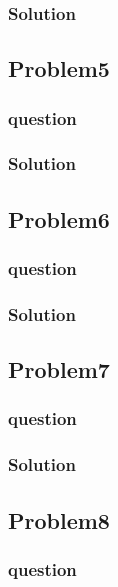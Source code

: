 \documentclass[journal,12pt,twocolumn]{IEEEtran}
\begin{document}
\subsubsection{Solution}


\subsection{Problem5}
\subsubsection{question}

\subsubsection{Solution}


\subsection{Problem6}
\subsubsection{question}

\subsubsection{Solution}


\subsection{Problem7}
\subsubsection{question}

\subsubsection{Solution}


\subsection{Problem8}
\subsubsection{question}

\end{document}
